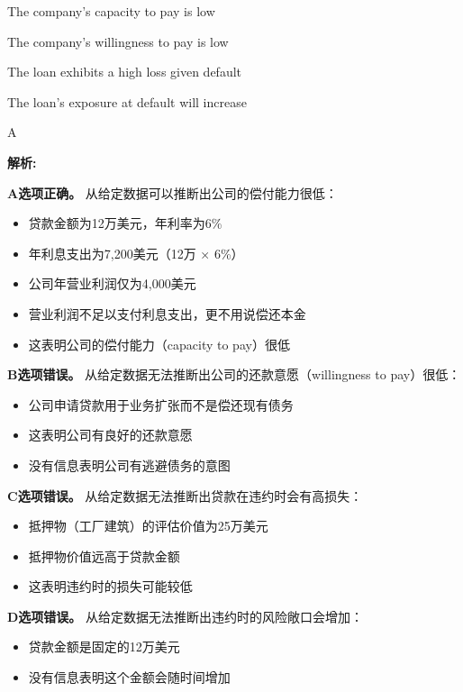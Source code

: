 \documentclass{article}
\newenvironment{explanation}
{\textbf{解析:}\par}
{\par}
\begin{document}
\begin{choices}
    \item The company's capacity to pay is low
    \item The company's willingness to pay is low
    \item The loan exhibits a high loss given default
    \item The loan's exposure at default will increase
\end{choices}

\begin{correctanswer}
    A
\end{correctanswer}

\begin{explanation}
    \textbf{A选项正确。}
    从给定数据可以推断出公司的偿付能力很低：
    \begin{itemize}
        \item 贷款金额为12万美元，年利率为6\%
        \item 年利息支出为7,200美元（12万 × 6\%）
        \item 公司年营业利润仅为4,000美元
        \item 营业利润不足以支付利息支出，更不用说偿还本金
        \item 这表明公司的偿付能力（capacity to pay）很低
    \end{itemize}

    \textbf{B选项错误。}
    从给定数据无法推断出公司的还款意愿（willingness to pay）很低：
    \begin{itemize}
        \item 公司申请贷款用于业务扩张而不是偿还现有债务
        \item 这表明公司有良好的还款意愿
        \item 没有信息表明公司有逃避债务的意图
    \end{itemize}

    \textbf{C选项错误。}
    从给定数据无法推断出贷款在违约时会有高损失：
    \begin{itemize}
        \item 抵押物（工厂建筑）的评估价值为25万美元
        \item 抵押物价值远高于贷款金额
        \item 这表明违约时的损失可能较低
    \end{itemize}

    \textbf{D选项错误。}
    从给定数据无法推断出违约时的风险敞口会增加：
    \begin{itemize}
        \item 贷款金额是固定的12万美元
        \item 没有信息表明这个金额会随时间增加
    \end{itemize}
\end{explanation}
\end{document}
